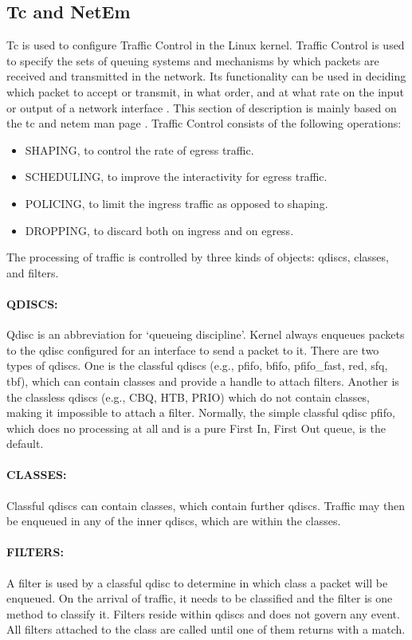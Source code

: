\subsection{Tc and NetEm} \label{sec:tan}
Tc is used to configure Traffic Control in the Linux kernel. Traffic Control is used to specify the sets of queuing systems and mechanisms by which packets are received and transmitted in the network. Its functionality can be used in deciding which packet to accept or transmit, in what order, and at what rate on the input or output of a network interface \cite{howtc}. This section of description is mainly based on the tc and netem man page \cite{tc-man} \cite{netemman}. Traffic Control consists of the following operations:

\begin{itemize}
	\item SHAPING, to control the rate of egress traffic.
	\item SCHEDULING, to improve the interactivity for egress traffic.
	\item POLICING, to limit the ingress traffic as opposed to shaping.
	\item DROPPING, to discard both on ingress and on egress.
\end{itemize}

The processing of traffic is controlled by three kinds of objects: qdiscs, classes, and filters.
\paragraph{QDISCS:} Qdisc is an abbreviation for `queueing discipline'. Kernel always enqueues packets to the qdisc configured for an interface to send a packet to it. There are two types of qdiscs. One is the classful qdiscs (e.g., pfifo, bfifo, pfifo\_fast, red, sfq, tbf), which can contain classes and provide a handle to attach filters. Another is the classless qdiscs (e.g., CBQ, HTB, PRIO) which do not contain classes, making it impossible to attach a filter. Normally, the simple classful qdisc pfifo, which does no processing at all and is a pure First In, First Out queue, is the default.
\paragraph{CLASSES:} Classful qdiscs can contain classes, which contain further qdiscs. Traffic may then be enqueued in any of the inner qdiscs, which are within the classes.
\paragraph{FILTERS:} A filter is used by a classful qdisc to determine in which class a packet will be enqueued. On the arrival of traffic, it needs to be classified and the filter is one method to classify it. Filters reside within qdiscs and does not govern any event. All filters attached to the class are called until one of them returns with a match.

